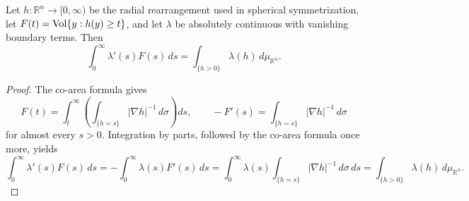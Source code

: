\begin{proposition}
\label{prop:chow-iii-appj-solution-22-18}
Let \(h:\mathbb R^n\to[0,\infty)\) be the radial rearrangement used in
spherical symmetrization, let
\(F(t)=\operatorname{Vol}\{y:h(y)\geq t\}\), and let \(\lambda\) be absolutely continuous
with vanishing boundary terms.  Then
\[
 \int_0^\infty\lambda'(s)F(s)\,ds
 =\int_{\{h>0\}}\lambda(h)\,d\mu_{\mathbb R^n}.
\]
\end{proposition}
\begin{proof}
The co-area formula gives
\[
 F(t)=\int_t^\infty\left(\int_{\{h=s\}}|\nabla h|^{-1}\,d\sigma\right)ds,
 \qquad
 -F'(s)=\int_{\{h=s\}}|\nabla h|^{-1}\,d\sigma
\]
for almost every \(s>0\).  Integration by parts, followed by the co-area
formula once more, yields
\[
 \int_0^\infty\lambda'(s)F(s)\,ds
 =-\int_0^\infty\lambda(s)F'(s)\,ds
 =\int_0^\infty\lambda(s)
   \int_{\{h=s\}}|\nabla h|^{-1}\,d\sigma\,ds
 =\int_{\{h>0\}}\lambda(h)\,d\mu_{\mathbb R^n}.
\]
\end{proof}

